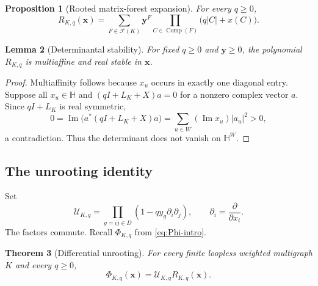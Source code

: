 \documentclass[11pt]{article}
\numberwithin{equation}{section}
\newtheorem{theorem}{Theorem}[section]
\newtheorem{proposition}[theorem]{Proposition}
\newtheorem{lemma}[theorem]{Lemma}
\newcommand{\cF}{\mathcal F}
\newcommand{\Hh}{\mathbb H}
\newcommand{\yy}{\bm y}
\newcommand{\xx}{\bm x}
\newcommand{\Comp}{\operatorname{Comp}}
\begin{document}
\begin{proposition}[Rooted matrix-forest expansion]\label{prop:rooted-expansion}
For every $q\geq0$,
\begin{equation}\label{eq:R-expansion}
 R_{K,q}(\xx)
 =\sum_{F\in\cF(K)}\yy^F
  \prod_{C\in\Comp(F)}\bigl(q|C|+x(C)\bigr).
\end{equation}
\end{proposition}

\begin{lemma}[Determinantal stability]\label{lem:R-stable}
For fixed $q\geq0$ and $\yy\geq0$, the polynomial $R_{K,q}$ is multiaffine and real stable in $\xx$.
\end{lemma}

\begin{proof}
Multiaffinity follows because $x_u$ occurs in exactly one diagonal entry.  Suppose all $x_u\in\Hh$ and $(qI+L_K+X)a=0$ for a nonzero complex vector $a$.  Since $qI+L_K$ is real symmetric,
\[
 0=\operatorname{Im}\bigl(a^*(qI+L_K+X)a\bigr)
  =\sum_{u\in W}(\operatorname{Im}x_u)|a_u|^2>0,
\]
a contradiction.  Thus the determinant does not vanish on $\Hh^W$.
\end{proof}

\subsection{The unrooting identity}

Set
\begin{equation}\label{eq:U-def}
 \mathcal U_{K,q}
 =\prod_{g=ij\in D}\left(1-qy_g\partial_i\partial_j\right),
 \qquad \partial_i=\frac{\partial}{\partial x_i}.
\end{equation}
The factors commute.  Recall $\Phi_{K,q}$ from \eqref{eq:Phi-intro}.

\begin{theorem}[Differential unrooting]\label{thm:unrooting}
For every finite loopless weighted multigraph $K$ and every $q\geq0$,
\begin{equation}\label{eq:unrooting}
 \Phi_{K,q}(\xx)=\mathcal U_{K,q}R_{K,q}(\xx).
\end{equation}
\end{theorem}
\end{document}
